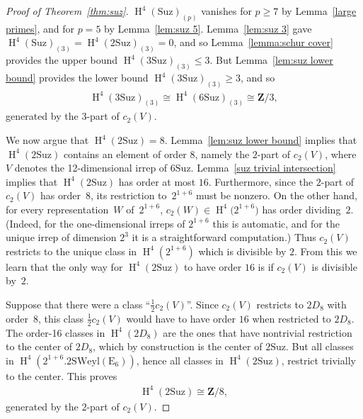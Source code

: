 \documentclass[pdftex]{sigma}
\numberwithin{equation}{section}
\newcommand\bZ{\mathbf Z}
\newcommand\rE{\mathrm E}
\DeclareMathOperator\homology{H}
\renewcommand\H{\homology}
\newcommand\<\langle
\renewcommand\>\rangle
\newcommand\Suz{\mathrm{Suz}}
\newcommand\SWeyl{\mathrm{SWeyl}}
\begin{document}
\begin{proof}[Proof of Theorem~\ref{thm:suz}] $\H^4(\Suz)_{(p)}$ vanishes for $p\geq 7$ by Lemma~\ref{large primes}, {and for $p=5$ by Lemma~\ref{lem:suz 5}}. Lemma~\ref{lem:suz 3} gave $\H^4(\Suz)_{(3)} = \H^4(2\Suz)_{(3)} = 0$, and so Lemma~\ref{lemma:schur cover} provides the upper bound $\H^4(3\Suz)_{(3)} \leq 3$. But Lemma~\ref{lem:suz lower bound} provides the lower bound $\H^4(3\Suz)_{(3)} \geq 3$, and so{\samepage
 \begin{gather*} \H^4(3\Suz)_{(3)} \cong \H^4(6\Suz)_{(3)} \cong \bZ/3, \end{gather*}
 generated by the $3$-part of $c_2(V)$.}

We now argue that $\H^4(2\Suz) = 8$. Lemma~\ref{lem:suz lower bound} implies that $\H^4(2\Suz)$ contains an element of order $8$, namely the $2$-part of $c_2(V)$, where $V$ denotes the 12-dimensional irrep of $6\Suz$. Lemma~\ref{suz trivial intersection} implies that $\H^4(2\Suz)$ has order at most $16$. Furthermore, since the $2$-part of~$c_2(V)$ has order~$8$, its restriction to~$2^{1+6}$ must be nonzero. On the other hand, for every representation~$W$ of~$2^{1+6}$, $c_2(W) \in \H^4\big(2^{1+6}\big)$ has order dividing~$2$. (Indeed, for the one-dimensional irreps of $2^{1+6}$ this is automatic, and for the unique irrep of dimension $2^3$ it is a straightforward computation.) Thus $c_2(V)$ restricts to the unique class in $\H^4(2^{1+6})$ which is divisible by $2$. From this we learn that the only way for $\H^4(2\Suz)$ to have order $16$ is if $c_2(V)$ is divisible by~$2$.

 Suppose that there were a class ``$\frac12 c_2(V)$''. Since $c_2(V)$ restricts to $2D_8$ with order~$8$, this class $\frac12 c_2(V)$ would have to have order $16$ when restricted to $2D_8$. The order-16 classes in $\H^4(2D_8)$ are the ones that have nontrivial restriction to the center of $2D_8$, which by construction is the center of $2\Suz$. But all classes in $\H^4(2^{1+6}.2\SWeyl(\rE_6))$, hence all classes in $\H^4(2\Suz)$, restrict trivially to the center. This proves
 \begin{gather*} \H^4(2\Suz) \cong \bZ/8, \end{gather*}
 generated by the $2$-part of $c_2(V)$.


\end{proof}
\end{document}
